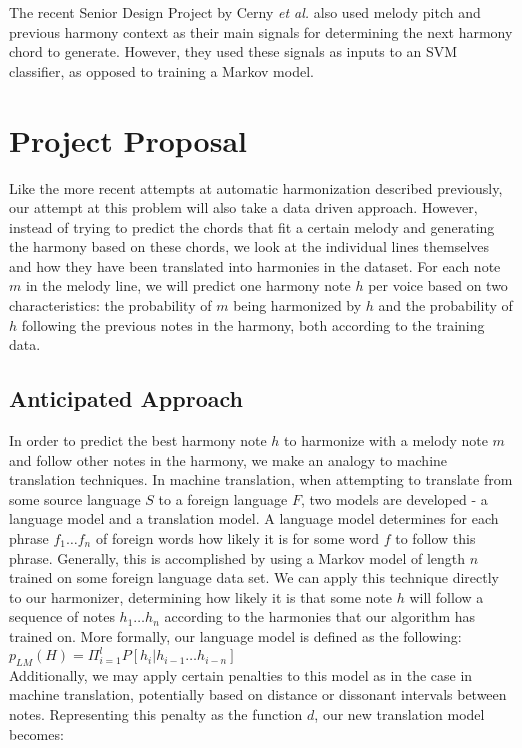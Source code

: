 \documentclass{sig-alternate}
\begin{document}
The recent Senior Design Project by Cerny \textit{et al.} \cite{UAMP} also used melody pitch and previous harmony context
as their main signals for determining the next harmony chord to generate. However, they used these
signals as inputs to an SVM classifier, as opposed to training a Markov model. 

\section{Project Proposal}
\label{sec:project_proposal}
Like the more recent attempts at automatic harmonization described previously, our attempt at this problem will also
take a data driven approach. However, instead of trying to predict the chords that fit a certain melody and generating
the harmony based on these chords, we look at the individual lines themselves and how they have been translated into
harmonies in the dataset. For each note $m$ in the melody line, we will predict one harmony note $h$ per voice
based on two characteristics: the probability of $m$ being harmonized by $h$ and the probability of $h$ following the 
previous notes in the harmony, both according to the training data.

\subsection{Anticipated Approach}
\label{subsec:approach}
In order to predict the best harmony note $h$ to harmonize with a melody note $m$ and follow other notes in the harmony,
we make an analogy to machine translation techniques. In machine translation, when attempting to translate from some source
language $S$ to a foreign language $F$, two models are developed - a language model and a translation model.
A language model determines for each phrase $f_1 \ldots f_n$ of foreign words how likely it is for some word $f$ to follow this phrase. 
Generally, this is accomplished by using a Markov model of length $n$ trained on some foreign language data set. We can apply 
this technique directly to our harmonizer, determining how likely it is that some note $h$ will follow a sequence of notes $h_1 \ldots h_n$ according to the harmonies that our algorithm has trained on. More formally, our language model is defined as the following:\\

$p_{LM}(H) = \Pi_{i = 1}^{l} P[h_{i} | h_{i - 1} \ldots h_{i - n}]$\\

Additionally, we may apply certain penalties to this model as in the case in machine translation, potentially based on distance or dissonant intervals between notes. Representing this penalty as the function $d$, our new translation model becomes:\\
\end{document}
